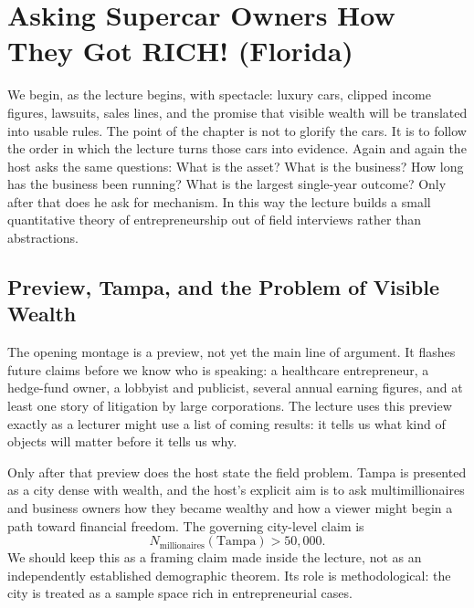\chapter{Asking Supercar Owners How They Got RICH! (Florida)}

We begin, as the lecture begins, with spectacle: luxury cars, clipped income figures, lawsuits, sales lines, and the promise that visible wealth will be translated into usable rules. The point of the chapter is not to glorify the cars. It is to follow the order in which the lecture turns those cars into evidence. Again and again the host asks the same questions: What is the asset? What is the business? How long has the business been running? What is the largest single-year outcome? Only after that does he ask for mechanism. In this way the lecture builds a small quantitative theory of entrepreneurship out of field interviews rather than abstractions.

\section{Preview, Tampa, and the Problem of Visible Wealth}

The opening montage is a preview, not yet the main line of argument. It flashes future claims before we know who is speaking: a healthcare entrepreneur, a hedge-fund owner, a lobbyist and publicist, several annual earning figures, and at least one story of litigation by large corporations. The lecture uses this preview exactly as a lecturer might use a list of coming results: it tells us what kind of objects will matter before it tells us why.

Only after that preview does the host state the field problem. Tampa is presented as a city dense with wealth, and the host's explicit aim is to ask multimillionaires and business owners how they became wealthy and how a viewer might begin a path toward financial freedom. The governing city-level claim is
\begin{equation}
N_{\text{millionaires}}(\text{Tampa}) > 50{,}000.
\end{equation}
We should keep this as a framing claim made inside the lecture, not as an independently established demographic theorem. Its role is methodological: the city is treated as a sample space rich in entrepreneurial cases.


